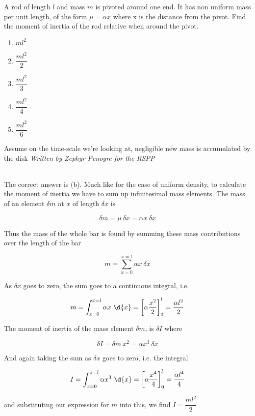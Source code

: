 \begin{problem} 
{A rod of length $l$ and mass $m$ is pivoted around one end. It has non uniform mass per unit length, of the form $\mu = \alpha x$ where x is the distance from the pivot. Find the moment of inertia of the rod relative when around the pivot.

\begin{enumerate}
	\item $m l^2$
	\item $\dfrac{ml^2}{2}$
	\item $\dfrac{ml^2}{3}$
	\item $\dfrac{ml^2}{4}$
	\item $\dfrac{ml^2}{6}$
\end{enumerate}}
{Assume on the time-scale we're looking at, negligible new mass is accumulated by the disk}
{\textit{Written by Zephyr Penoyre for the RSPP}
}
{\\
The correct answer is (b).
Much like for the case of uniform density, to calculate the moment of inertia we have to sum up infinitesimal mass elements. The mass of an element $\delta m$ at $x$ of length $\delta x$ is

\begin{equation*}
\delta m = \mu~ \delta x = \alpha x ~ \delta x
\end{equation*}

Thus the mass of the whole bar is found by summing these mass contributions over the length of the bar

\begin{equation*}
m = \sum_{x=0}^{x =l} \alpha x ~ \delta x
\end{equation*}

As $\delta x$ goes to zero, the sum goes to a continuous integral, i.e.

\begin{equation*}
m = \int_{x=0}^{x =l} \alpha x ~ \d{ x} = \left[ \alpha \dfrac{x^2}{2} \right]_0^l = \dfrac{\alpha l^2}{2}
\end{equation*}

The moment of inertia of the mass element $\delta m$, is $\delta I$ where

\begin{equation*}
\delta I =  \delta m~ x^2 = \alpha x^3 ~\delta x
\end{equation*}

And again taking the sum as $\delta x$ goes to zero, i.e. the integral

\begin{equation*}
I = \int_{x=0}^{x =l} \alpha x^3 ~ \d{ x} = \left[ \alpha \dfrac{x^4}{4} \right]_0^l = \dfrac{\alpha l^4}{4}
\end{equation*}

and substituting our expression for $m$ into this, we find $I = \dfrac{ml^2}{2}$
}
\end{problem}